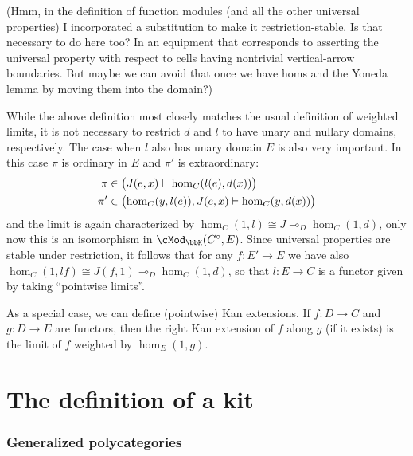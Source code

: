 \documentclass{amsart}
\newcommand{\K}{\bbK}
\let\mod\cMod
\def\modk{\mod_\K}
\def\mor#1{\hom_{#1}}
\renewcommand{\o}{^{\circ}}
\let\mto\vdash    %
\def\mhom#1#2{\left( #1 \vphantom{\big|}\mto #2 \right)}
\begin{document}
(Hmm, in the definition of function modules (and all the other universal properties) I incorporated a substitution to make it restriction-stable.  Is that necessary to do here too?  In an equipment that corresponds to asserting the universal property with respect to cells having nontrivial vertical-arrow boundaries.  But maybe we can avoid that once we have homs and the Yoneda lemma by moving them into the domain?)

While the above definition most closely matches the usual definition of weighted limits, it is not necessary to restrict $d$ and $l$ to have unary and nullary domains, respectively.
The case when $l$ also has unary domain $E$ is also very important.
In this case $\pi$ is ordinary in $E$ and $\pi'$ is extraordinary:
\begin{align*}
\pi &\in \mhom{J(e,x)}{\mor{C}(l(e),d(x))} \\
\pi' &\in \mhom{\mor{C}(y,l(e)),J(e,x)}{\mor{C}(y,d(x))}
\end{align*}
and the limit is again characterized by $\mor{C}(1,l) \cong J \multimap_D \mor{C}(1,d)$, only now this is an isomorphism in $\modk(C\o,E)$.
Since universal properties are stable under restriction, it follows that for any $f:E'\to E$ we have also $\mor{C}(1,l f) \cong J(f,1) \multimap_D \mor{C}(1,d)$, so that $l:E\to C$ is a functor given by taking ``pointwise limits''.

As a special case, we can define (pointwise) Kan extensions.
If $f:D\to C$ and $g:D\to E$ are functors, then the right Kan extension of $f$ along $g$ (if it exists) is the limit of $f$ weighted by $\mor{E}(1,g)$.

\part{The definition of a kit}
\label{part:def}

\section{Generalized polycategories}
\label{sec:genpoly}
\end{document}
